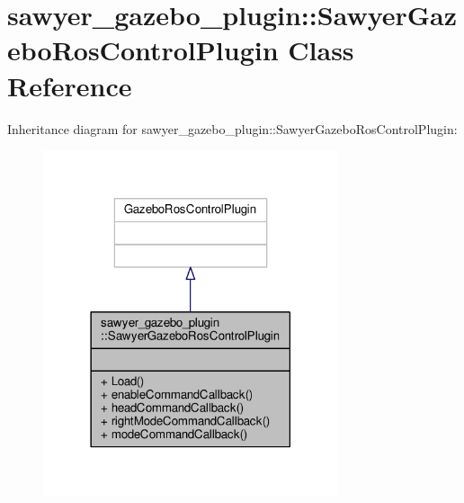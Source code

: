 \hypertarget{classsawyer__gazebo__plugin_1_1_sawyer_gazebo_ros_control_plugin}{\section{sawyer\-\_\-gazebo\-\_\-plugin\-:\-:Sawyer\-Gazebo\-Ros\-Control\-Plugin Class Reference}
\label{classsawyer__gazebo__plugin_1_1_sawyer_gazebo_ros_control_plugin}
}


Inheritance diagram for sawyer\-\_\-gazebo\-\_\-plugin\-:\-:Sawyer\-Gazebo\-Ros\-Control\-Plugin\-:
\nopagebreak
\begin{figure}[H]
\begin{center}
\leavevmode
\includegraphics[width=246pt]{classsawyer__gazebo__plugin_1_1_sawyer_gazebo_ros_control_plugin__inherit__graph}
\end{center}
\end{figure}


